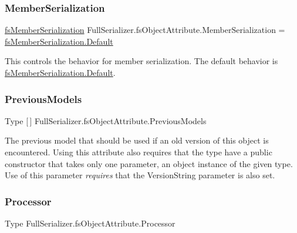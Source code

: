 \subsubsection{\texorpdfstring{Member\+Serialization}{MemberSerialization}}
{\footnotesize\ttfamily \hyperlink{namespace_full_serializer_ad0dc98cd54a3d07f8c579d82585906f8}{fs\+Member\+Serialization} Full\+Serializer.\+fs\+Object\+Attribute.\+Member\+Serialization = \hyperlink{namespace_full_serializer_ad0dc98cd54a3d07f8c579d82585906f8a7a1920d61156abc05a60135aefe8bc67}{fs\+Member\+Serialization.\+Default}}



This controls the behavior for member serialization. The default behavior is \hyperlink{namespace_full_serializer_ad0dc98cd54a3d07f8c579d82585906f8a7a1920d61156abc05a60135aefe8bc67}{fs\+Member\+Serialization.\+Default}. 

\mbox{\label{class_full_serializer_1_1fs_object_attribute_ae82b6c5b9d90688cfa0ff8ecc5b53c9c}} 
\subsubsection{\texorpdfstring{Previous\+Models}{PreviousModels}}
{\footnotesize\ttfamily Type \mbox{[}$\,$\mbox{]} Full\+Serializer.\+fs\+Object\+Attribute.\+Previous\+Models}



The previous model that should be used if an old version of this object is encountered. Using this attribute also requires that the type have a public constructor that takes only one parameter, an object instance of the given type. Use of this parameter {\itshape requires} that the Version\+String parameter is also set. 

\mbox{\label{class_full_serializer_1_1fs_object_attribute_a2f71f5d718abe0eb30544ff6f8510664}} 
\subsubsection{\texorpdfstring{Processor}{Processor}}
{\footnotesize\ttfamily Type Full\+Serializer.\+fs\+Object\+Attribute.\+Processor}



